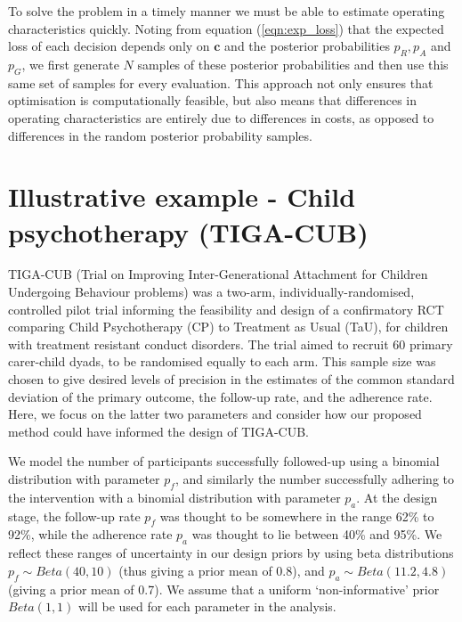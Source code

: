 \documentclass[AMA,STIX1COL]{WileyNJD-v2}
\begin{document}
To solve the problem in a timely manner we must be able to estimate operating characteristics quickly. Noting from equation (\ref{eqn:exp_loss}) that the expected loss of each decision depends only on $\mathbf{c}$ and the posterior probabilities $p_R, p_A$ and $p_G$, we first generate $N$ samples of these posterior probabilities and then use this same set of samples for every evaluation. This approach not only ensures that optimisation is computationally feasible, but also means that differences in operating characteristics are entirely due to differences in costs, as opposed to differences in the random posterior probability samples.

\section{Illustrative example - Child psychotherapy (TIGA-CUB)}\label{sec:TIGA}

TIGA-CUB (Trial on Improving Inter-Generational Attachment for Children Undergoing Behaviour problems) was a two-arm, individually-randomised, controlled pilot trial informing the feasibility and design of a confirmatory RCT comparing Child Psychotherapy (CP) to Treatment as Usual (TaU), for children with treatment resistant conduct disorders. The trial aimed to recruit $60$ primary carer-child dyads, to be randomised equally to each arm. This sample size was chosen to give desired levels of precision in the estimates of the common standard deviation of the primary outcome, the follow-up rate, and the adherence rate. Here, we focus on the latter two parameters and consider how our proposed method could have informed the design of TIGA-CUB.

We model the number of participants successfully followed-up using a binomial distribution with parameter $p_f$, and similarly the number successfully adhering to the intervention with a binomial distribution with parameter $p_a$. At the design stage, the follow-up rate $p_f$ was thought to be somewhere in the range 62\% to 92\%, while the adherence rate $p_a$ was thought to lie between 40\% and 95\%. We reflect these ranges of uncertainty in our design priors by using beta distributions $p_f \sim Beta(40, 10)$ (thus giving a prior mean of 0.8), and $p_a \sim Beta(11.2, 4.8)$ (giving a prior mean of 0.7). We assume that a uniform `non-informative' prior $Beta(1,1)$ will be used for each parameter in the analysis.

\end{document}
